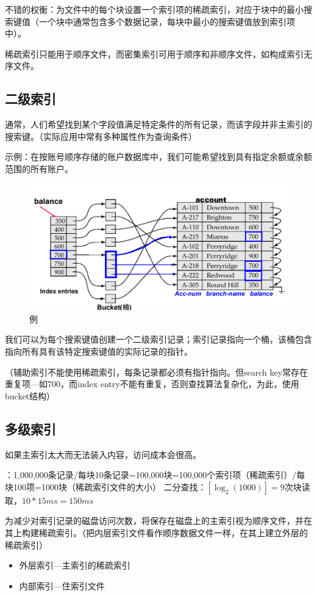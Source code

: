 不错的权衡：为文件中的每个块设置一个索引项的稀疏索引，对应于块中的最小搜索键值（一个块中通常包含多个数据记录，每块中最小的搜索键值放到索引项中）。

稀疏索引只能用于顺序文件，而密集索引可用于顺序和非顺序文件，如构成索引无序文件。

\subsection{二级索引}

通常，人们希望找到某个字段值满足特定条件的所有记录，而该字段并非主索引的搜索键。（实际应用中常有多种属性作为查询条件）

示例：在按账号顺序存储的账户数据库中，我们可能希望找到具有指定余额或余额范围的所有账户。

\begin{figure}[H]
    \centering
    \includegraphics[width=0.9\linewidth]{image4.png}
    \caption{例}
    \label{}
\end{figure}

我们可以为每个搜索键值创建一个二级索引记录；索引记录指向一个桶，该桶包含指向所有具有该特定搜索键值的实际记录的指针。

（辅助索引不能使用稀疏索引，每条记录都必须有指针指向。但search key常存在重复项---如700，而index entry不能有重复，否则查找算法复杂化，为此，使用bucket结构）

\subsection{多级索引}

如果主索引太大而无法装入内容，访问成本会很高。

：1,000,000条记录/每块10条记录=100,000块=100,000个索引项（稀疏索引）/每块100项=1000块（稀疏索引文件的大小）
二分查找：$[\log_2(1000)]=9$次块读取，$10*15ms=150ms$

为减少对索引记录的磁盘访问次数，将保存在磁盘上的主索引视为顺序文件，并在其上构建稀疏索引。（把内层索引文件看作顺序数据文件一样，在其上建立外层的稀疏索引）
\begin{itemize}
    \item 外层索引---主索引的稀疏索引
    \item 内部索引---住索引文件
\end{itemize}

